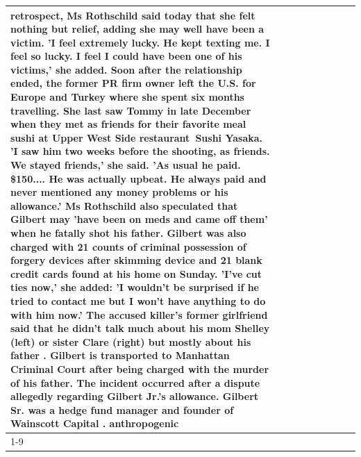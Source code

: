 \begin{table}[H]
\begin{tabular}{lllrlllll}
retrospect, Ms Rothschild said today that she felt nothing but relief, adding she may well have been a victim. 'I feel extremely lucky. He kept texting me. I feel so lucky. I feel I could have been one of his victims,' she added. Soon after the relationship ended, the former PR firm owner left the U.S. for Europe and Turkey where she spent six months  travelling. She last saw Tommy in late December when they met as friends for their favorite meal sushi at Upper West Side restaurant Sushi Yasaka. 'I saw him two weeks before the shooting, as friends. We stayed friends,' she said. 'As usual he paid. \$150.... He was actually upbeat. He always paid and never mentioned any money problems or his allowance.' Ms Rothschild also speculated that Gilbert may 'have been on meds and came off them' when he fatally shot his father. Gilbert was also charged with 21 counts of criminal possession of forgery devices after skimming device and 21 blank credit cards found at his home on Sunday. 'I've cut ties now,' she added: 'I wouldn’t be surprised if he tried to contact me but I won’t have anything to do with him now.' The accused killer's former girlfriend said that he didn't talk much about his mom Shelley (left) or sister Clare (right) but mostly about his father . Gilbert is transported to Manhattan Criminal Court  after being charged with the murder of his father. The incident occurred after a dispute allegedly regarding Gilbert Jr.'s allowance. Gilbert Sr. was a hedge fund manager and founder of Wainscott Capital . anthropogenic \\
\cline{1-9} \cline{2-9}

\end{tabular}
\end{table}
